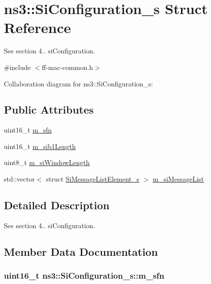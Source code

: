 \hypertarget{structns3_1_1SiConfiguration__s}{}\section{ns3\+:\+:Si\+Configuration\+\_\+s Struct Reference}
\label{structns3_1_1SiConfiguration__s}


See section 4.. si\+Configuration.  




{\ttfamily \#include $<$ff-\/mac-\/common.\+h$>$}



Collaboration diagram for ns3\+:\+:Si\+Configuration\+\_\+s\+:
\subsection*{Public Attributes}
\begin{DoxyCompactItemize}
\item 
uint16\+\_\+t \hyperlink{structns3_1_1SiConfiguration__s_acb746394756539268c1871c2d06db460}{m\+\_\+sfn}
\item 
uint16\+\_\+t \hyperlink{structns3_1_1SiConfiguration__s_a5739d3cf4987010ca66859e3f0c746c5}{m\+\_\+sib1\+Length}
\item 
uint8\+\_\+t \hyperlink{structns3_1_1SiConfiguration__s_af8658e1a3942abdba4a315497d1104d4}{m\+\_\+si\+Window\+Length}
\item 
std\+::vector$<$ struct \hyperlink{structns3_1_1SiMessageListElement__s}{Si\+Message\+List\+Element\+\_\+s} $>$ \hyperlink{structns3_1_1SiConfiguration__s_a530943fa395ebd8518ea274989718d07}{m\+\_\+si\+Message\+List}
\end{DoxyCompactItemize}


\subsection{Detailed Description}
See section 4.. si\+Configuration. 

\subsection{Member Data Documentation}
\subsubsection[{\texorpdfstring{m\+\_\+sfn}{m_sfn}}]{\setlength{\rightskip}{0pt plus 5cm}uint16\+\_\+t ns3\+::\+Si\+Configuration\+\_\+s\+::m\+\_\+sfn}\hypertarget{structns3_1_1SiConfiguration__s_acb746394756539268c1871c2d06db460}{}\label{structns3_1_1SiConfiguration__s_acb746394756539268c1871c2d06db460}
